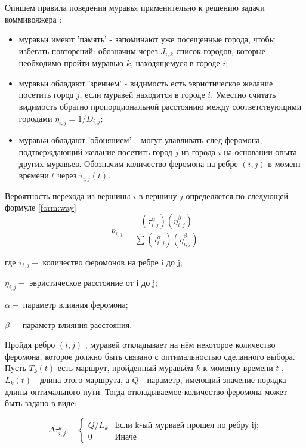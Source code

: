 Опишем правила поведения муравья применительно к решению задачи коммивояжера \cite{shtovba}:

\begin{itemize}

	\item муравьи имеют 'память' - запоминают уже посещенные города, чтобы избегать повторений: обозначим через $J_{i,k}$ список городов, которые необходимо пройти муравью $k$, находящемуся в городе $i$;

	\item муравьи обладают 'зрением' - видимость есть эвристическое желание посетить город $j$, если муравей находится в городе $i$. Уместно считать видимость обратно пропорциональной расстоянию между соответствующими городами $\eta_{i,j} = 1/D_{i,j}$;

	\item муравьи обладают 'обонянием' -- могут улавливать след феромона, подтверждающий желание посетить город $j$ из города $i$ на основании опыта других муравьев. Обозначим количество феромона на ребре $(i,j)$ в момент времени $t$ через $\tau_{i,j}(t)$. 

\end{itemize}

Вероятность перехода из вершины $i$ в вершину $j$ определяется по следующей формуле \ref{form:way}\\   

\begin{equation}\label{form:way} 
	p_{i,j}={\frac {(\tau_{i,j}^{\alpha })(\eta_{i,j}^{\beta })}{\sum (\tau_{i,j}^{\alpha})(\eta_{i,j}^{\beta })}}
\end{equation}

где \quad$ \tau_{i,j} - $ количество феромонов на ребре i до j;


$\eta_{i,j} - $ эвристическое расстояние от i до j;


$\alpha - $ параметр влияния феромона;


$\beta - $ параметр влияния расстояния.

Пройдя ребро $(i,j)$ , муравей откладывает на нём некоторое количество феромона, которое должно быть связано с оптимальностью сделанного выбора. Пусть $T _{k} (t)$ есть маршрут, пройденный муравьём $k$ к моменту времени $t$ , $L _{k} (t)$ - длина этого маршрута, а $Q$ - параметр, имеющий значение порядка длины оптимального пути. Тогда откладываемое количество феромона может быть задано в виде:

\begin{equation}\label{form:add} 
	{\displaystyle \Delta \tau _{i,j}^k={\begin{cases}Q/L_{k}& {\mbox{Если k-ый мурваей прошел по ребру ij;}}\\0&{\mbox{Иначе}}\end{cases}}}
\end{equation}

